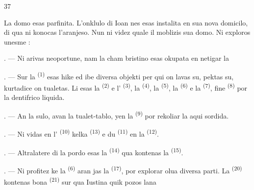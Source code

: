 \begin{VUpage}[39]{37}
\VUsaut{6.0mm}
\VUsaut{1.4mm}
\VUsaut{0.4mm}
\VUsaut{2.2mm}

\VUblancAlinea
La domo esas parfinita. L'onklulo di Ioan\cc
nes esas instalita en sua nova domicilo, di qua\nl
ni konocas l'aranjeso. Nun ni videz quale il\nl
moblizis sua domo. Ni exploros unesme :

\VUsaut{3.0mm}

. --- Ni arivas neoportune, nam la cham\cc
bristino esas okupata en netigar la 

. --- Sur la  \textsuperscript{(1)} esas hike ed ibe\nl
diversa objekti per qui on lavas su, pektas su,\nl
kurtadice on tualetas. Li esas la  \textsuperscript{(2)} e\nl
l' \textsuperscript{(3)}, la  \textsuperscript{(4)}, la \cc
{} \textsuperscript{(5)}, la  \textsuperscript{(6)} e la  \textsuperscript{(7)}, fine \cc
{} \textsuperscript{(8)} por la dentifrico liquida.

. --- An la sulo, avan la tualet-tablo, yen\nl
la  \textsuperscript{(9)} por rekoliar la aqui sordida.

. --- Ni vidas en l' \textsuperscript{(10)} kelka\nl
{} \textsuperscript{(13)} e du  \textsuperscript{(11)} en la \cc
{} \textsuperscript{(12)}.

. --- Altralatere di la pordo esas la \cc
{} \textsuperscript{(14)} qua kontenas la  \textsuperscript{(15)}.

. --- Ni profitez ke la  \textsuperscript{(6)} aran\cc
jas la  \textsuperscript{(17)}, por explorar olua diversa parti.\nl
La  \textsuperscript{(20)} kontenas bona \cc
{} \textsuperscript{(21)} sur qua Iustina quik pozos lana \cc
\parplein
\end{VUpage}

